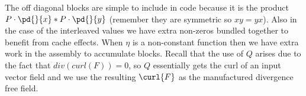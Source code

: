 The off diagonal blocks are simple to include in code because it is the product $P\cdot \pd{}{x} * P \cdot \pd{}{y}$ (remember they are symmetric so $xy = yx$). Also in the case of the interleaved values we have extra non-zeros bundled together to benefit from cache effects. When $\eta$ is a non-constant function then we have extra work in the assembly to accumulate blocks. Recall that the use of $Q$ arises due to the fact that $div(curl(F)) = 0$, so $Q$ essentially gets the curl of an input vector field and we use the resulting $\curl{F}$ as the manufactured divergence free field. 
